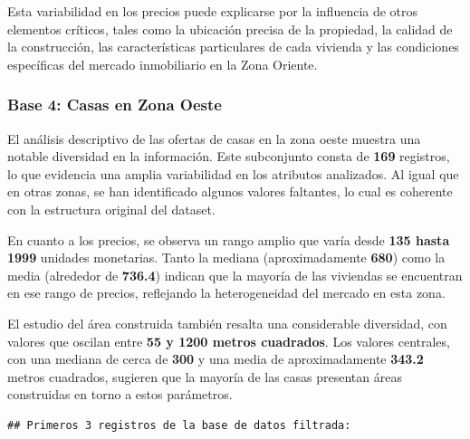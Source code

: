 \documentclass[
]{article}
\begin{document}
Esta variabilidad en los precios puede explicarse por la influencia de
otros elementos críticos, tales como la ubicación precisa de la
propiedad, la calidad de la construcción, las características
particulares de cada vivienda y las condiciones específicas del mercado
inmobiliario en la Zona Oriente.

\subsubsection{\texorpdfstring{\textbf{Base 4: Casas en Zona
Oeste}}{Base 4: Casas en Zona Oeste}}\label{base-4-casas-en-zona-oeste}

El análisis descriptivo de las ofertas de casas en la zona oeste muestra
una notable diversidad en la información. Este subconjunto consta de
\textbf{169} registros, lo que evidencia una amplia variabilidad en los
atributos analizados. Al igual que en otras zonas, se han identificado
algunos valores faltantes, lo cual es coherente con la estructura
original del dataset.

En cuanto a los precios, se observa un rango amplio que varía desde
\textbf{135 hasta 1999} unidades monetarias. Tanto la mediana
(aproximadamente \textbf{680}) como la media (alrededor de
\textbf{736.4}) indican que la mayoría de las viviendas se encuentran en
ese rango de precios, reflejando la heterogeneidad del mercado en esta
zona.

El estudio del área construida también resalta una considerable
diversidad, con valores que oscilan entre \textbf{55 y 1200 metros
cuadrados}. Los valores centrales, con una mediana de cerca de
\textbf{300} y una media de aproximadamente \textbf{343.2} metros
cuadrados, sugieren que la mayoría de las casas presentan áreas
construidas en torno a estos parámetros.

\begin{verbatim}
## Primeros 3 registros de la base de datos filtrada:
\end{verbatim}
\end{document}
